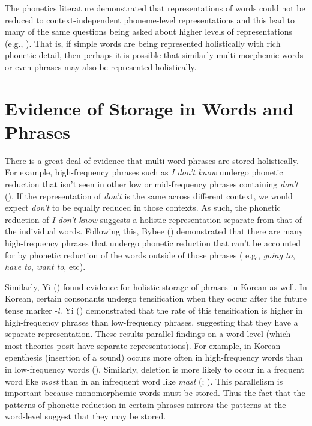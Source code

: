 \documentclass[
  12pt,
  letterpaper,
]{scrreprt}
\begin{document}
The phonetics literature demonstrated that representations of words
could not be reduced to context-independent phoneme-level
representations and this lead to many of the same questions being asked
about higher levels of representations (e.g.,
). That is, if simple words are
being represented holistically with rich phonetic detail, then perhaps
it is possible that similarly multi-morphemic words or even phrases may
also be represented holistically.

\section{Evidence of Storage in Words and
Phrases}\label{sec-evidence-of-storage-in-words-and-phrases}

There is a great deal of evidence that multi-word phrases are stored
holistically. For example, high-frequency phrases such as \emph{I don't
know} undergo phonetic reduction that isn't seen in other low or
mid-frequency phrases containing \emph{don't}
().
If the representation of \emph{don't} is the same across different
context, we would expect \emph{don't} to be equally reduced in those
contexts. As such, the phonetic reduction of \emph{I don't know}
suggests a holistic representation separate from that of the individual
words. Following this, Bybee ()
demonstrated that there are many high-frequency phrases that undergo
phonetic reduction that can't be accounted for by phonetic reduction of
the words outside of those phrases ( e.g., \emph{going to}, \emph{have
to}, \emph{want to}, etc).

Similarly, Yi () found evidence for
holistic storage of phrases in Korean as well. In Korean, certain
consonants undergo tensification when they occur after the future tense
marker -\emph{l}. Yi () demonstrated
that the rate of this tensification is higher in high-frequency phrases
than low-frequency phrases, suggesting that they have a separate
representation. These results parallel findings on a word-level (which
most theories posit have separate representations). For example, in
Korean epenthesis (insertion of a sound) occurs more often in
high-frequency words than in low-frequency words
(). Similarly, deletion is more likely to occur in a
frequent word like \emph{most} than in an infrequent word like
\emph{mast} (;
). This parallelism is important because monomorphemic words must
be stored. Thus the fact that the patterns of phonetic reduction in
certain phrases mirrors the patterns at the word-level suggest that they
may be stored.
\end{document}
